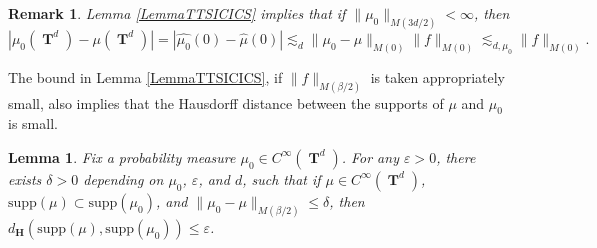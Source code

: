 \documentclass[dvipsnames,letterpaper,12pt]{article}
\numberwithin{equation}{section}
\DeclareMathOperator{\TT}{\mathbf{T}}
\newtheorem{lemma}[theorem]{Lemma}
\newtheorem{remark}[theorem]{Remark}
\numberwithin{theorem}{section}
\begin{document}
\begin{remark} \label{remarkFOIJIOSJCIOSJ}
    Lemma \ref{LemmaTTSICICS} implies that if $\| \mu_0 \|_{M(3d/2)} < \infty$, then
    \[ |\mu_0(\TT^d) - \mu(\TT^d)| = |\widehat{\mu_0}(0) - \widehat{\mu}(0)| \lesssim_d \| \mu_0 - \mu \|_{M(0)} \| f \|_{M(0)} \lesssim_{d,\mu_0} \| f \|_{M(0)}. \]
\end{remark}

The bound in Lemma \ref{LemmaTTSICICS}, if $\| f \|_{M(\beta/2)}$ is taken appropriately small, also implies that the Hausdorff distance between the supports of $\mu$ and $\mu_0$ is small.

\begin{lemma} \label{LemmaTAOIAWOIDJ12301}
    Fix a probability measure $\mu_0 \in C^\infty(\TT^d)$. For any $\varepsilon > 0$, there exists $\delta > 0$ depending on $\mu_0$, $\varepsilon$, and $d$, such that if $\mu \in C^\infty(\TT^d)$, $\text{supp}(\mu) \subset \text{supp}(\mu_0)$, and $\| \mu_0 - \mu \|_{M(\beta/2)} \leq \delta$, then $d_\mathbf{H}(\text{supp}(\mu),\text{supp}(\mu_0)) \leq \varepsilon$.
\end{lemma}
\end{document}
